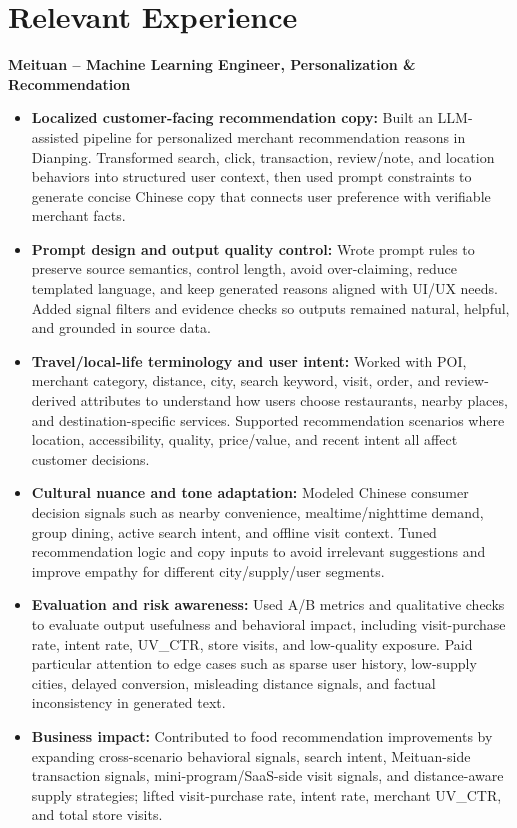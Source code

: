 \documentclass[a4paper,10pt]{article}
\newcommand{\resumeItem}[2]{
  {
    {\fontsize{9.8pt}{10.2pt}\selectfont\textbf{#1}}{ #2 \vspace{0pt}}
  }
}
\newcommand{\resumeSubItem}[2]{\resumeItem{#1}{#2}\vspace{0pt}}
\begin{document}
\section{Relevant Experience}
\resumeSubItem{Meituan -- Machine Learning Engineer, Personalization \& Recommendation}\hfill{Jul 2025 -- Present}
\begin{itemize}[leftmargin=*, itemsep=3pt, topsep=3pt]
\item \textbf{Localized customer-facing recommendation copy:} Built an LLM-assisted pipeline for personalized merchant recommendation reasons in Dianping. Transformed search, click, transaction, review/note, and location behaviors into structured user context, then used prompt constraints to generate concise Chinese copy that connects user preference with verifiable merchant facts.
\item \textbf{Prompt design and output quality control:} Wrote prompt rules to preserve source semantics, control length, avoid over-claiming, reduce templated language, and keep generated reasons aligned with UI/UX needs. Added signal filters and evidence checks so outputs remained natural, helpful, and grounded in source data.
\item \textbf{Travel/local-life terminology and user intent:} Worked with POI, merchant category, distance, city, search keyword, visit, order, and review-derived attributes to understand how users choose restaurants, nearby places, and destination-specific services. Supported recommendation scenarios where location, accessibility, quality, price/value, and recent intent all affect customer decisions.
\item \textbf{Cultural nuance and tone adaptation:} Modeled Chinese consumer decision signals such as nearby convenience, mealtime/nighttime demand, group dining, active search intent, and offline visit context. Tuned recommendation logic and copy inputs to avoid irrelevant suggestions and improve empathy for different city/supply/user segments.
\item \textbf{Evaluation and risk awareness:} Used A/B metrics and qualitative checks to evaluate output usefulness and behavioral impact, including visit-purchase rate, intent rate, UV\_CTR, store visits, and low-quality exposure. Paid particular attention to edge cases such as sparse user history, low-supply cities, delayed conversion, misleading distance signals, and factual inconsistency in generated text.
\item \textbf{Business impact:} Contributed to food recommendation improvements by expanding cross-scenario behavioral signals, search intent, Meituan-side transaction signals, mini-program/SaaS-side visit signals, and distance-aware supply strategies; lifted visit-purchase rate, intent rate, merchant UV\_CTR, and total store visits.
\end{itemize}
\end{document}
